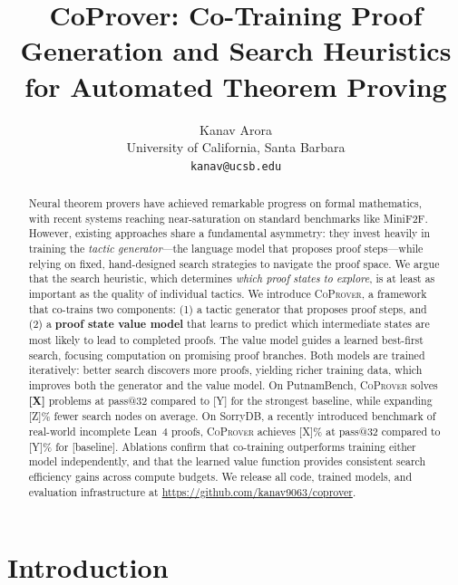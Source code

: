 \documentclass{article}
\title{CoProver: Co-Training Proof Generation and Search Heuristics\\for Automated Theorem Proving}
\author{
Kanav Arora \\
University of California, Santa Barbara \\
\texttt{kanav@ucsb.edu} \\
}
\newcommand{\coprover}{\textsc{CoProver}}
\begin{document}
\maketitle

\begin{abstract}
Neural theorem provers have achieved remarkable progress on formal mathematics, with recent systems reaching near-saturation on standard benchmarks like MiniF2F. However, existing approaches share a fundamental asymmetry: they invest heavily in training the \emph{tactic generator}---the language model that proposes proof steps---while relying on fixed, hand-designed search strategies to navigate the proof space. We argue that the search heuristic, which determines \emph{which proof states to explore}, is at least as important as the quality of individual tactics. We introduce \coprover{}, a framework that co-trains two components: (1) a tactic generator that proposes proof steps, and (2) a \textbf{proof state value model} that learns to predict which intermediate states are most likely to lead to completed proofs. The value model guides a learned best-first search, focusing computation on promising proof branches. Both models are trained iteratively: better search discovers more proofs, yielding richer training data, which improves both the generator and the value model. On PutnamBench, \coprover{} solves \textbf{[X]} problems at pass@32 compared to [Y] for the strongest baseline, while expanding [Z]\% fewer search nodes on average. On SorryDB, a recently introduced benchmark of real-world incomplete Lean~4 proofs, \coprover{} achieves [X]\% at pass@32 compared to [Y]\% for [baseline]. Ablations confirm that co-training outperforms training either model independently, and that the learned value function provides consistent search efficiency gains across compute budgets. We release all code, trained models, and evaluation infrastructure at \url{https://github.com/kanav9063/coprover}.
\end{abstract}

\section{Introduction}
\label{sec:intro}
\end{document}
